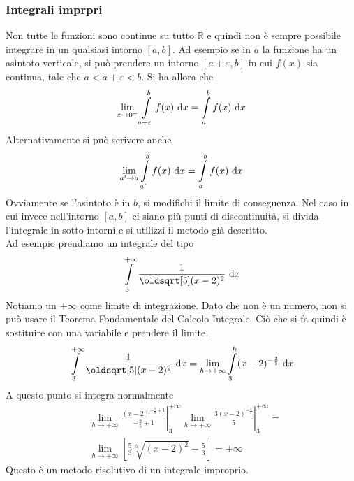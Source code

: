 \subsubsection{Integrali imprpri}
Non tutte le funzioni sono continue su tutto $\mathbb{R}$ e quindi non è sempre possibile integrare
in un qualsiasi intorno ${[a,b]}$. Ad esempio se in $a$ la funzione ha un asintoto verticale, si
può prendere un intorno $[a+\varepsilon,b]$ in cui $f(x)$ sia continua, tale che 
$a<a+\varepsilon<b$. Si ha allora che
\begin{equation*}
  \lim\limits_{\varepsilon\to0^+} \int\limits_{a+\varepsilon}^{b} f(x)\,\mathop{}\!\mathrm{d} x =
  \int\limits_{a}^{b} f(x)\,\mathop{}\!\mathrm{d} x
\end{equation*}
Alternativamente si può scrivere anche
\begin{equation*}
  \lim\limits_{a'\to a} \int\limits_{a'}^{b} f(x)\,\mathop{}\!\mathrm{d} x = \int\limits_{a}^{b} f(x)\,\mathop{}\!\mathrm{d} x
\end{equation*}
Ovviamente se l'asintoto è in $b$, si modifichi il limite di conseguenza. Nel caso in cui invece
nell'intorno ${[a,b]}$ ci siano più punti di discontinuità, si divida l'integrale in sotto-intorni
e si utilizzi il metodo già descritto.\\
Ad esempio prendiamo un integrale del tipo
\begin{equation*}
  \int\limits_{3}^{+\infty} \frac{1}{\sqrt[5]{(x-2)^2} }\,\dif x
\end{equation*}
Notiamo un $+\infty$ come limite di integrazione. Dato che non è un numero, non si può usare il
Teorema Fondamentale del Calcolo Integrale. Ciò che si fa quindi è sostituire con una variabile e
prendere il limite.
\begin{equation*}
  \int\limits_{3}^{+\infty} \frac{1}{\sqrt[5]{(x-2)^2} }\,\dif x = \lim\limits_{h\to+\infty} 
  \int\limits_{3}^{h} (x-2)^{-\frac{2}{5}}\,\dif x
\end{equation*}
A questo punto si integra normalmente
\begin{align*}
  &\lim\limits_{h\to+\infty}\left.\frac{(x-2)^{-\frac{2}{5}+1}}{-\frac{2}{5}+1}\right|_3^{+\infty}
  \lim\limits_{h\to+\infty} \left.\frac{3(x-2)^{-\frac{3}{5}}}{5}\right|_3^{+\infty}=\\
  &\lim\limits_{h\to+\infty} \left[ \frac{5}{3}\sqrt[5]{(x-2)^2}-\frac{5}{3} \right]=+\infty
\end{align*}
Questo è un metodo risolutivo di un integrale improprio.

